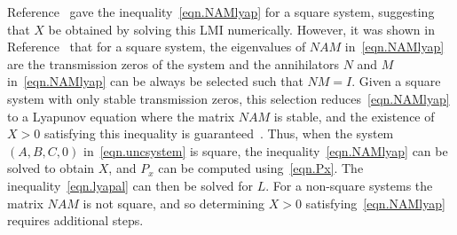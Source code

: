 Reference\ \cite{huang.designspr.1999} gave the inequality\ \eqref{eqn.NAMlyap} for a square system, suggesting that $X$ be obtained by solving this LMI numerically.
However, it was shown in Reference\ \cite{kouvaritakis.part1.1976} that for a square system, the eigenvalues of $NAM$ in\ \eqref{eqn.NAMlyap} are the transmission zeros of the system and the annihilators $N$ and $M$ in\ \eqref{eqn.NAMlyap} can be always be selected such that $NM=I$.
Given a square system with only stable transmission zeros, this selection reduces\ \eqref{eqn.NAMlyap} to a Lyapunov equation where the matrix $NAM$ is stable, and the existence of $X>0$ satisfying this inequality is guaranteed\ \cite{barkana.comments.2004}.
Thus, when the system $(A,B,C,0)$ in\ \eqref{eqn.uncsystem} is square, the inequality\ \eqref{eqn.NAMlyap} can be solved to obtain $X$, and $P_{x}$ can be computed using\ \eqref{eqn.Px}.
The inequality\ \eqref{eqn.lyapal} can then be solved for $L$.
For a non-square systems the matrix $NAM$ is not square, and so determining $X>0$ satisfying\ \eqref{eqn.NAMlyap} requires additional steps.

